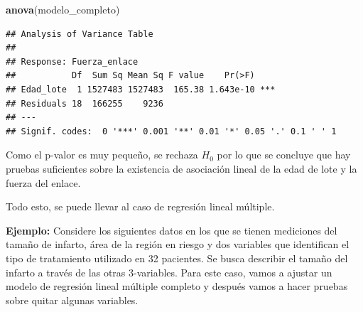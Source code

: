 \documentclass[
]{book}
\newenvironment{Shaded}{\begin{snugshade}}{\end{snugshade}}
\newcommand{\FunctionTok}[1]{\textcolor[rgb]{0.13,0.29,0.53}{\textbf{#1}}}
\newcommand{\NormalTok}[1]{#1}
\begin{document}
\begin{Shaded}
\begin{Highlighting}[]
\FunctionTok{anova}\NormalTok{(modelo\_completo)}
\end{Highlighting}
\end{Shaded}

\begin{verbatim}
## Analysis of Variance Table
## 
## Response: Fuerza_enlace
##           Df  Sum Sq Mean Sq F value    Pr(>F)    
## Edad_lote  1 1527483 1527483  165.38 1.643e-10 ***
## Residuals 18  166255    9236                      
## ---
## Signif. codes:  0 '***' 0.001 '**' 0.01 '*' 0.05 '.' 0.1 ' ' 1
\end{verbatim}

Como el p-valor es muy pequeño, se rechaza \(H_0\) por lo que se concluye que hay pruebas suficientes sobre la existencia de asociación lineal de la edad de lote y la fuerza del enlace.

Todo esto, se puede llevar al caso de regresión lineal múltiple.

\textbf{Ejemplo:} Considere los siguientes datos en los que se tienen mediciones del tamaño de infarto, área de la región en riesgo y dos variables que identifican el tipo de tratamiento utilizado en 32 pacientes. Se busca describir el tamaño del infarto a través de las otras 3-variables. Para este caso, vamos a ajustar un modelo de regresión lineal múltiple completo y después vamos a hacer pruebas sobre quitar algunas variables.
\end{document}
